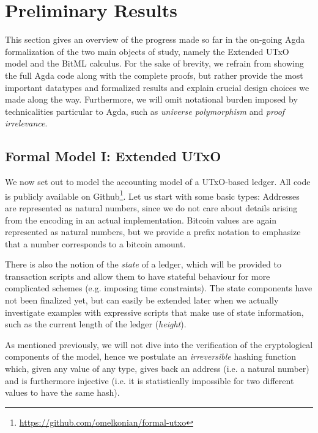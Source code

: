 \documentclass[acmsmall,nonacm=true,screen=true]{acmart}
\newcommand\site[1]{\footnote{\url{#1}}}
\begin{document}
\section{Preliminary Results}
\label{sec:results}
This section gives an overview of the progress made so far in the on-going Agda formalization of the two main objects of study,
namely the Extended UTxO model and the BitML calculus.
For the sake of brevity, we refrain from showing the full Agda code along with the complete proofs, but rather
provide the most important datatypes and formalized results and explain crucial design choices we made along the way.
Furthermore, we will omit notational burden imposed by technicalities particular to Agda, such as \textit{universe polymorphism}
and \textit{proof irrelevance}.

\subsection{Formal Model I: Extended UTxO} \label{subsec:eutxo}
We now set out to model the accounting model of a UTxO-based ledger.
All code is publicly available on Github\site{https://github.com/omelkonian/formal-utxo}.
Let us start with some basic types:
\UTXObasicTypes{}
Addresses are represented as natural numbers, since we do not care about details arising from the encoding in an
actual implementation. Bitcoin values are again represented as natural numbers, but we provide a prefix notation
to emphasize that a number corresponds to a bitcoin amount.

There is also the notion of the \textit{state} of a ledger, which will be provided to transaction scripts and allow
them to have stateful behaviour for more complicated schemes (e.g. imposing time constraints).
\UTXOstate{}
The state components have not been finalized yet, but can easily be extended later when we actually investigate
examples with expressive scripts that make use of state information, such as the current length of the ledger (\textit{height}).

As mentioned previously, we will not dive into the verification of the cryptological components of the model,
hence we postulate an \textit{irreversible} hashing function which, given any value of any type,
gives back an address (i.e. a natural number) and is furthermore injective (i.e. it is statistically impossible for two different
values to have the same hash).
\UTXOhash{}
\end{document}
